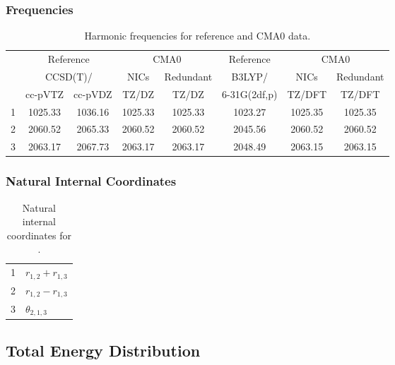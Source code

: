 \documentclass[10pt,oneside]{article}
\begin{document}
\begin{table}[h!]
\subsubsection*{Frequencies}
\centering
\caption{Harmonic frequencies for reference and CMA0 data.}
\begin{tabular}{cccccccc}
\toprule
{} & \multicolumn{2}{c}{Reference} & \multicolumn{2}{c}{CMA0} &    Reference & \multicolumn{2}{c}{CMA0} \\
{} & \multicolumn{2}{c}{CCSD(T)/} &    NICs &  Redundant &       B3LYP/ &    NICs & Redundant \\
{} &   cc-pVTZ & cc-pVDZ &   TZ/DZ &      TZ/DZ & 6-31G(2df,p) &  TZ/DFT &    TZ/DFT \\
\midrule
1 &   1025.33 & 1036.16 & 1025.33 &    1025.33 &      1023.27 & 1025.35 &   1025.35 \\
2 &   2060.52 & 2065.33 & 2060.52 &    2060.52 &      2045.56 & 2060.52 &   2060.52 \\
3 &   2063.17 & 2067.73 & 2063.17 &    2063.17 &      2048.49 & 2063.15 &   2063.15 \\
\bottomrule
\end{tabular}
\end{table}

\begin{table}[h!]
\subsubsection*{Natural Internal Coordinates}
\centering
\caption{Natural internal coordinates for .}
\small
\begin{tabular}{ll}
\toprule
  1   & $r_{1,2} + r_{1,3}$ \\
  2   & $r_{1,2} - r_{1,3}$ \\
  3   & $\theta_{2,1,3}$ \\
\bottomrule
\end{tabular}
\end{table}

\begin{table}
\subsection*{Total Energy Distribution}
\centering\end{table}

\clearpage

\subsection{}
\end{document}
